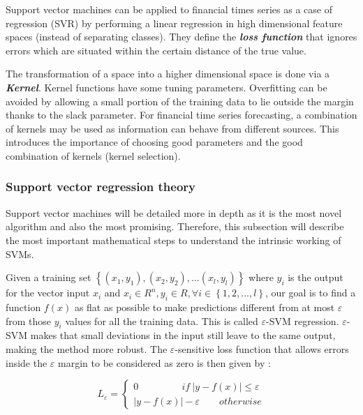 \documentclass[11pt,a4paper,oneside]{book}
\begin{document}
Support vector machines can be applied to financial times series as a case of regression (SVR) by performing a linear regression in high dimensional feature spaces (instead of separating classes). They define the \textit{\textbf{loss function}} that ignores errors which are situated within the certain distance of the true value.

The transformation of a space into a higher dimensional space is done via a \textit{\textbf{Kernel}}. Kernel functions have some tuning parameters. Overfitting can be avoided by allowing a small portion of the training data to lie outside the margin thanks to the slack parameter. For financial time series forecasting, a combination of kernels may be used as information can behave from different sources. This introduces the importance of choosing good parameters and the good combination of kernels (kernel selection). \cite{kim}\cite{liwang}\cite{Smola}


\subsubsection{Support vector regression theory}

Support vector machines will be detailed more in depth as it is the most novel algorithm and also the most promising. Therefore, this subsection will describe the most important mathematical steps to understand the intrinsic working of SVMs.

Given a training set $\left \{ \left ( x_{1}, y_{1} \right ), \left ( x_{2}, y_{2} \right ), ... \left ( x_{l}, y_{l} \right ) \right \}$ where $y_{i}$ is the output for the vector input $x_{i}$ and $x_{i} \in R^{n} , y_{i} \in R,  \forall i \in \left \{ 1,2, ...,l \right \}$, our goal is to find a function $f\left ( x \right )$ as flat as possible to make predictions different from at most $\varepsilon$ from those $y_{i}$ values for all the training data. This is called $\varepsilon$-SVM regression. $\varepsilon$-SVM makes that small deviations in the input still leave to the same output, making the method more robust. The $\varepsilon$-sensitive loss function that allows errors inside the $\varepsilon$ margin to be considered as zero is then given by :

\begin{equation}
L_{\varepsilon} = \left\{\begin{matrix}
0 \qquad\qquad\ \   if \ \left | y - f\left ( x \right )\right | \leq \varepsilon \\ 
\left | y - f\left ( x \right )\right | - \varepsilon \qquad otherwise
\end{matrix}\right.
\end{equation} \cite{Cortes}\cite{Smola} 
\end{document}
